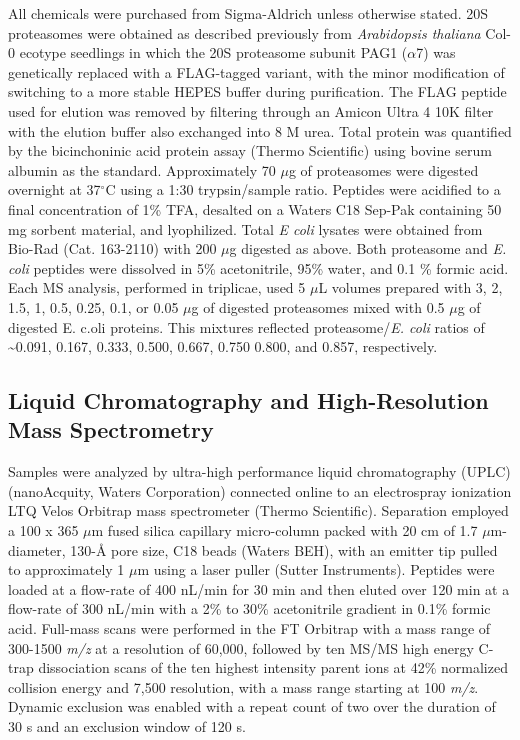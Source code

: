 All chemicals were purchased from Sigma-Aldrich unless otherwise stated.  20S proteasomes were obtained as described previously \citep{book10} from \textit{Arabidopsis thaliana} Col-0 ecotype seedlings in which the 20S proteasome subunit PAG1 ($\alpha$7) was genetically replaced with a FLAG-tagged variant, with the minor modification of switching to a more stable HEPES buffer during purification.  The FLAG peptide used for elution was removed by filtering through an Amicon Ultra 4 10K filter with the elution buffer also exchanged into 8 M urea.  Total protein was quantified by the bicinchoninic acid protein assay (Thermo Scientific) using bovine serum albumin as the standard.  Approximately 70 $\mu$g of proteasomes were digested overnight at 37$^\circ$C using a 1:30 trypsin/sample ratio.  Peptides were acidified to a final concentration of 1\% TFA, desalted on a Waters C18 Sep-Pak containing 50 mg sorbent material, and lyophilized.  Total \textit{E coli} lysates were obtained from Bio-Rad (Cat. 163-2110) with 200 $\mu$g digested as above.  Both proteasome and \textit{E. coli} peptides were dissolved in 5\% acetonitrile, 95\% water, and 0.1 \% formic acid.  Each MS analysis, performed in triplicae, used 5 $\mu$L volumes prepared with 3, 2, 1.5, 1, 0.5, 0.25, 0.1, or 0.05 $\mu$g of digested proteasomes mixed with 0.5 $\mu$g of digested E. c.oli proteins.  This mixtures reflected proteasome/\textit{E. coli} ratios of \textasciitilde0.091, 0.167, 0.333, 0.500, 0.667, 0.750 0.800, and 0.857, respectively.

\subsection{Liquid Chromatography and High-Resolution Mass Spectrometry}

Samples were analyzed by ultra-high performance liquid chromatography (UPLC) (nanoAcquity, Waters Corporation) connected online to an electrospray ionization LTQ Velos Orbitrap mass spectrometer (Thermo Scientific).  Separation employed a 100 x 365 $\mu$m fused silica capillary micro-column packed with 20 cm of 1.7 $\mu$m-diameter, 130-Å pore size, C18 beads (Waters BEH), with an emitter tip pulled to approximately 1 $\mu$m using a laser puller (Sutter Instruments).  Peptides were loaded at a flow-rate of 400 nL/min for 30 min and then eluted over 120 min at a flow-rate of 300 nL/min with a 2\% to 30\% acetonitrile gradient in 0.1\% formic acid.  Full-mass scans were performed in the FT Orbitrap with a mass range of 300-1500 \textit{m/z} at a resolution of 60,000, followed by ten MS/MS high energy C-trap dissociation scans of the ten highest intensity parent ions at 42\% normalized collision energy and 7,500 resolution, with a mass range starting at 100 \textit{m/z}.  Dynamic exclusion was enabled with a repeat count of two over the duration of 30 s and an exclusion window of 120 s.  

